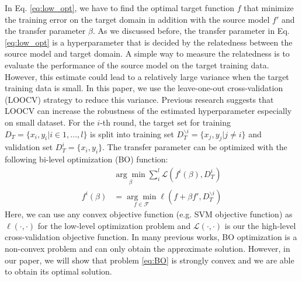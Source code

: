 In Eq. \eqref{eq:low_opt}, we have to find the optimal target function $f$ that minimize the training error on the target domain in addition with the source model $f'$ and the transfer parameter $\beta$. As we discussed before, the transfer parameter in Eq. \eqref{eq:low_opt} is a hyperparameter that is decided by the relatedness between the source model and target domain. A simple way to measure the relatedness is to evaluate the performance of the source model on the target training data. However, this estimate could lead to a relatively large variance when the target training data is small. In this paper, we use the leave-one-out cross-validation (LOOCV) strategy to reduce this variance. Previous research \cite{kuzborskij2013stability} suggests that LOOCV can increase the robustness of the estimated hyperparameter especially on small dataset. For the $i$-th round, the target set for training $D_T=\{x_i,y_i|i \in 1,...,l \}$ is split into training set $D_T^{\backslash i}=\{x_j,y_j|j\neq i\}$ and validation set $D_T^{i}=\{x_i,y_i\}$. The transfer parameter can be optimized with the following bi-level optimization (BO) function:
\begin{equation}\label{eq:BO}
\begin{aligned}
&\underset{\beta}{\arg \min}\sum_i^l\mathcal{L}(f^{i}(\beta),D_T^{i})\\
f^{i}(\beta)&=\underset{f \in \mathcal{F}}{\arg \min}\ell\left(f+\beta f',D_T^{\backslash i}\right) 
\end{aligned}
\end{equation} 
Here, we can use any convex objective function (e.g. SVM objective function) as $\ell(\cdot,\cdot)$ for the low-level optimization problem and $\mathcal{L}(\cdot,\cdot)$ is our the high-level cross-validation objective function.
In many previous works\cite{maclaurin2015gradient}\cite{Pedregosa16}, BO optimization is a non-convex problem and can only obtain the approximate solution. However, in our paper, we will show that problem \eqref{eq:BO} is strongly convex and we are able to obtain its optimal solution. 

